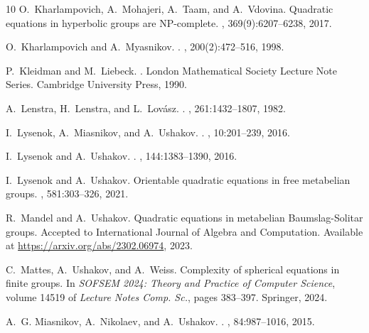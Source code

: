 \documentclass{jgcc}
\begin{document}
\begin{thebibliography}{10}
O.~{Kharlampovich}, A.~{Mohajeri}, A.~{Taam}, and A.~{Vdovina}.
\newblock Quadratic equations in hyperbolic groups are {NP}-complete.
, 369(9):6207--6238, 2017.

O.~{Kharlampovich} and A.~{Myasnikov}.
.
, 200(2):472--516, 1998.

P.~{Kleidman} and M.~{Liebeck}.
.
\newblock London Mathematical Society Lecture Note Series. Cambridge University Press, 1990.

A.~{Lenstra}, H.~{Lenstra}, and L.~{Lov\'asz}.
.
, 261:1432--1807, 1982.

I.~{Lysenok}, A.~{Miasnikov}, and A.~{Ushakov}.
.
, 10:201--239, 2016.

I.~{Lysenok} and A.~{Ushakov}.
.
, 144:1383--1390, 2016.

I.~{Lysenok} and A.~{Ushakov}.
\newblock Orientable quadratic equations in free metabelian groups.
, 581:303--326, 2021.

R.~{Mandel} and A.~{Ushakov}.
\newblock Quadratic equations in metabelian {B}aumslag-{S}olitar groups.
\newblock Accepted to International Journal of Algebra and Computation. Available at \url{https://arxiv.org/abs/2302.06974}, 2023.

C.~{Mattes}, A.~{Ushakov}, and A.~{Weiss}.
\newblock Complexity of spherical equations in finite groups.
\newblock In {\em SOFSEM 2024: Theory and Practice of Computer Science}, volume 14519 of {\em Lecture Notes Comp. Sc.}, pages 383--397. Springer, 2024.

A.~G. {Miasnikov}, A.~{Nikolaev}, and A.~{Ushakov}.
.
, 84:987--1016, 2015.


\end{thebibliography}
\end{document}
